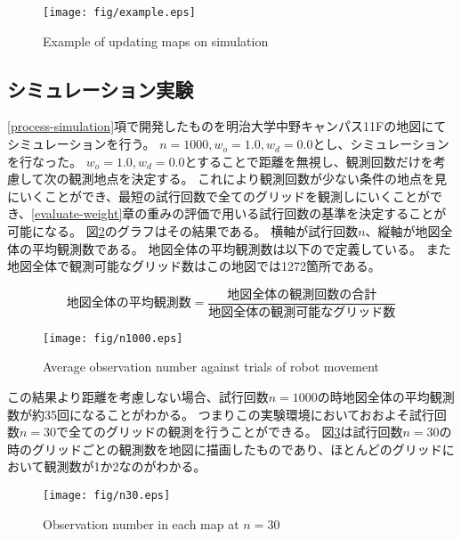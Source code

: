 \documentclass{jsarticle}
\begin{document}
\begin{figure}[tbh]
 \centering
  \texttt{[image: fig/example.eps]}
  \vspace*{-4mm}
  \caption{Example of updating maps on simulation}
  \label{fig: example of simulation}
\end{figure}

\subsection{シミュレーション実験}
\label{run-simulation}
\ref{process-simulation}項で開発したものを明治大学中野キャンパス11Fの地図にてシミュレーションを行う。
$n=1000,w_o=1.0,w_d=0.0$とし、シミュレーションを行なった。
$w_o=1.0,w_d=0.0$とすることで距離を無視し、観測回数だけを考慮して次の観測地点を決定する。
これにより観測回数が少ない条件の地点を見にいくことができ、最短の試行回数で全てのグリッドを観測しにいくことができ、\ref{evaluate-weight}章の重みの評価で用いる試行回数の基準を決定することが可能になる。
図\ref{fig: result of experiments}のグラフはその結果である。
横軸が試行回数$n$、縦軸が地図全体の平均観測数である。
地図全体の平均観測数は以下ので定義している。
また地図全体で観測可能なグリッド数はこの地図では1272箇所である。

\begin{equation}
  地図全体の平均観測数 = \frac{地図全体の観測回数の合計}{地図全体の観測可能なグリッド数}
	\label{eqn: average-in-map}
\end{equation}

\begin{figure}[tbh]
 \centering
  \texttt{[image: fig/n1000.eps]}
  \vspace*{-4mm}
  \caption{Average observation number against trials of robot movement}
  \label{fig: result of experiments}
\end{figure}

この結果より距離を考慮しない場合、試行回数$n=1000$の時地図全体の平均観測数が約35回になることがわかる。
つまりこの実験環境においておおよそ試行回数$n=30$で全てのグリッドの観測を行うことができる。
図\ref{fig: n30}は試行回数$n=30$の時のグリッドごとの観測数を地図に描画したものであり、ほとんどのグリッドにおいて観測数が1か2なのがわかる。


\begin{figure}[tbh]
 \centering
  \texttt{[image: fig/n30.eps]}
  \vspace*{-4mm}
  \caption{Observation number in each map at $n=30$}
  \label{fig: n30}
\end{figure}
\end{document}
